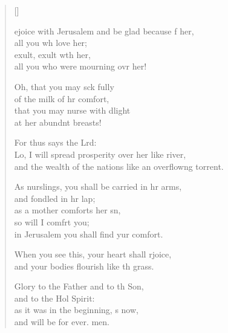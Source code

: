 \settowidth{\versewidth}{and the wealth of the nations like an overflowing torrent.}
\begin{verse}[\versewidth]
  \begin{patverse}
ejoice with Jerusalem and be glad because f her,\Med\\
all you wh love her;\\
exult, exult w\pointup{\i}th her,\Med\\
all you who were mourning ovr her!

Oh, that you may sck fully\Med\\
of the milk of hr comfort,\\
that you may nurse with dlight\Med\\
at her abundnt breasts!

For thus says the Lrd:\Flex\\
Lo, I will spread prosperity over her like  river,\Med\\
and the wealth of the nations like an overflow\pointup{\i}ng torrent.

As nurslings, you shall be carried in hr arms,\Med\\
and fondled in hr lap;\\
as a mother comforts her sn,\Flex\\
so will I comfrt you;\Med\\
in Jerusalem you shall find yur comfort.

When you see this, your heart shall rjoice,\Med\\
and your bodies flourish like th grass.

Glory to the Father and to th Son,\Med\\
and to the Hol Spirit:\\
as it was in the beginning, \pointup{\i}s now,\Med\\
and will be for ever. men.
  \end{patverse}
\end{verse}
